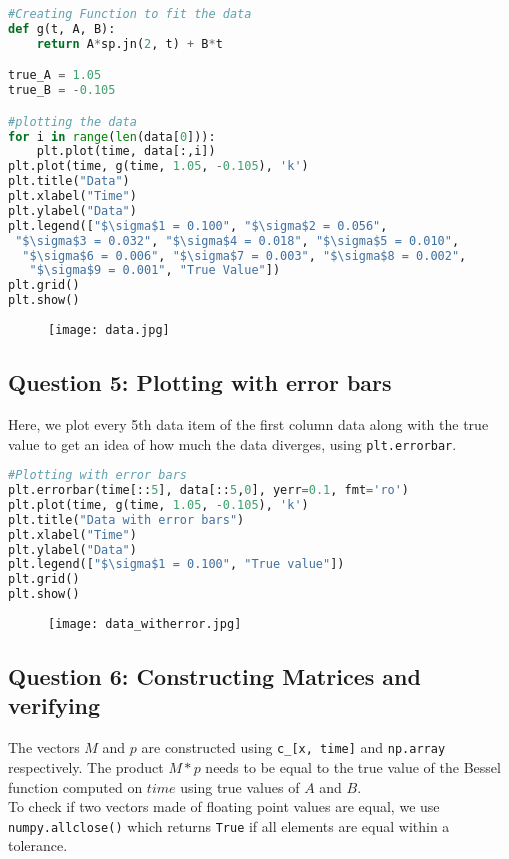 \documentclass[11pt, a4paper]{article}
\begin{document}
\begin{lstlisting}[language = Python]
#Creating Function to fit the data
def g(t, A, B):
    return A*sp.jn(2, t) + B*t

true_A = 1.05
true_B = -0.105

#plotting the data
for i in range(len(data[0])):
    plt.plot(time, data[:,i])
plt.plot(time, g(time, 1.05, -0.105), 'k')
plt.title("Data")
plt.xlabel("Time")
plt.ylabel("Data")
plt.legend(["$\sigma$1 = 0.100", "$\sigma$2 = 0.056",
 "$\sigma$3 = 0.032", "$\sigma$4 = 0.018", "$\sigma$5 = 0.010",
  "$\sigma$6 = 0.006", "$\sigma$7 = 0.003", "$\sigma$8 = 0.002",
   "$\sigma$9 = 0.001", "True Value"])
plt.grid()  
plt.show()

\end{lstlisting}

\begin{figure}[H]
     \centering
     \texttt{[image: data.jpg]}
\end{figure}



\subsection{Question 5: Plotting with error bars}
Here, we plot every 5th data item of the first column data along with the true value to get an idea of how much the data diverges, using \texttt{plt.errorbar}.\\

\begin{lstlisting}[language = Python]
#Plotting with error bars
plt.errorbar(time[::5], data[::5,0], yerr=0.1, fmt='ro')
plt.plot(time, g(time, 1.05, -0.105), 'k')
plt.title("Data with error bars")
plt.xlabel("Time")
plt.ylabel("Data")
plt.legend(["$\sigma$1 = 0.100", "True value"])
plt.grid()
plt.show()
\end{lstlisting}

\begin{figure}[H]
     \centering
     \texttt{[image: data\_witherror.jpg]}
\end{figure}


\subsection{Question 6: Constructing Matrices and verifying}
The vectors $M$ and $p$ are constructed using \texttt{c\_[x, time]} and \texttt{np.array} respectively. The product $M*p$ needs to be equal to the true value of the Bessel function computed on $time$ using true values of $A$ and $B$. \\To check if two vectors made of floating point values are equal, we use \texttt{numpy.allclose()} which returns \texttt{True} if all elements are equal within a tolerance.\\
\end{document}
